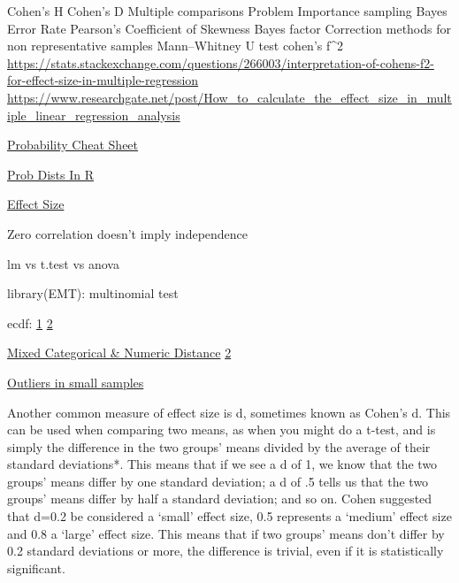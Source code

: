 \documentclass[]{book}
\begin{document}
Cohen's H \textbar{} Cohen's D \textbar{} Multiple comparisons Problem \textbar{} Importance sampling \textbar{} Bayes Error Rate \textbar{} Pearson's Coefficient of Skewness \textbar{} Bayes factor \textbar{} Correction methods for non representative samples \textbar{} Mann--Whitney U test \textbar{} cohen's f\^{}2 \textbar{} \url{https://stats.stackexchange.com/questions/266003/interpretation-of-cohens-f2-for-effect-size-in-multiple-regression} \textbar{} \url{https://www.researchgate.net/post/How_to_calculate_the_effect_size_in_multiple_linear_regression_analysis}

\href{http://www.wzchen.com/probability-cheatsheet}{Probability Cheat Sheet}

\href{http://www.cyclismo.org/tutorial/R/probability.html}{Prob Dists In R}

\href{https://www.leeds.ac.uk/educol/documents/00002182.htm}{Effect Size}

Zero correlation doesn't imply independence

lm vs t.test vs anova

library(EMT): multinomial test

ecdf: \href{http://www.ericmjl.com/blog/2018/7/14/ecdfs/}{1} \textbar{} \href{https://www.rdocumentation.org/packages/stats/versions/3.4.3/topics/ecdf}{2}

\href{https://www.rdocumentation.org/packages/StatMatch/versions/1.2.5/topics/gower.dist}{Mixed Categorical \& Numeric Distance} \textbar{} \href{https://www.rdocumentation.org/packages/ltm/versions/1.1-1/topics/biserial.cor}{2}

\href{https://stats.stackexchange.com/questions/78609/outlier-detection-in-very-small-sets/78617\#78617}{Outliers in small samples}

Another common measure of effect size is d, sometimes known as Cohen's d. This can be used when comparing two means, as when you might do a t-test, and is simply the difference in the two groups' means divided by the average of their standard deviations*. This means that if we see a d of 1, we know that the two groups' means differ by one standard deviation; a d of .5 tells us that the two groups' means differ by half a standard deviation; and so on. Cohen suggested that d=0.2 be considered a `small' effect size, 0.5 represents a `medium' effect size and 0.8 a `large' effect size. This means that if two groups' means don't differ by 0.2 standard deviations or more, the difference is trivial, even if it is statistically significant.
\end{document}
